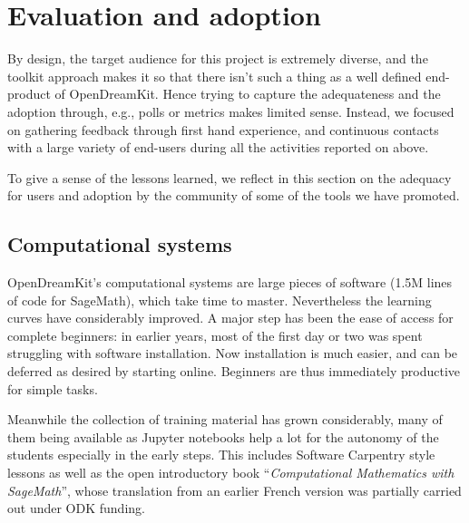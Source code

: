 \documentclass{deliverablereport}
\begin{document}




\section{Evaluation and adoption}

By design, the target audience for this project is extremely diverse,
and the toolkit approach makes it so that there isn't such a thing as
a well defined end-product of OpenDreamKit. Hence trying to capture
the adequateness and the adoption through, e.g., polls or metrics
makes limited sense. Instead, we focused on gathering feedback through
first hand experience, and continuous contacts with a large variety of
end-users during all the activities reported on above.

To give a sense of the lessons learned, we reflect in this section on
the adequacy for users and adoption by the community of some of the
tools we have promoted.

\subsection{Computational systems}

OpenDreamKit's computational systems are large pieces of software
(1.5M lines of code for SageMath), which take time to master.
Nevertheless the learning curves have considerably improved. A major
step has been the ease of access for complete beginners: in earlier
years, most of the first day or two was spent struggling with software
installation. Now installation is much easier, and can be deferred as
desired by starting online. Beginners are thus immediately productive
for simple tasks.

Meanwhile the collection of training material has grown considerably,
many of them being available as Jupyter notebooks help a lot for the
autonomy of the students especially in the early steps. This includes
Software Carpentry style lessons as well as the open introductory book
``\emph{Computational Mathematics with SageMath}'', whose translation
from an earlier French version was partially carried out under ODK
funding.
\end{document}

